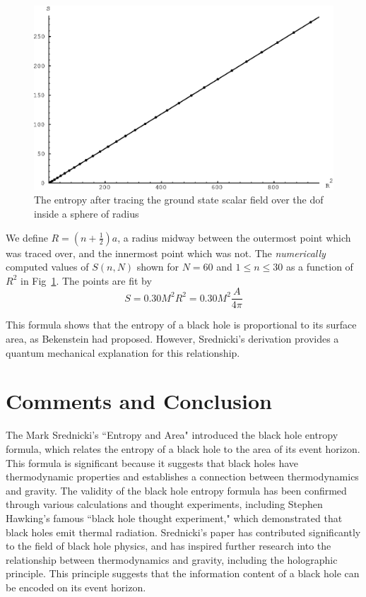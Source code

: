 \documentclass[%
 mph,%
 reprint,%
]{revtex4-2}
\begin{document}
\begin{figure}[!ht]
    \centering
    \includegraphics[scale=0.5]{msfig.eps}
    \caption{The entropy after tracing the ground state scalar field over the dof inside a sphere of radius}
    \label{fig:my_label}
\end{figure}
We define $R=(n+ \frac{1}{2})a$, a radius midway between the outermost point which was traced over, and the innermost point which was not.  The \textit{numerically} computed values of $S(n,N)$  shown for $N=60$ and $1\le n\le 30$ as a function
of $R^2$ in Fig~\ref{fig:my_label}.  The points are fit by 
\begin{equation}
    S=0.30 M^2 R^2  = 0.30 M^2 \frac{A}{4\pi}
\end{equation}


This formula shows that the entropy of a black hole is proportional to its surface area, as Bekenstein\cite{PhysRevD.7.2333} had proposed. However, Srednicki's derivation provides a quantum mechanical explanation for this relationship.


\section{Comments and Conclusion}
The Mark Srednicki's ``Entropy and Area" introduced the black hole entropy formula, which relates the entropy of a black hole to the area of its event horizon. This formula is significant because it suggests that black holes have thermodynamic properties and establishes a connection between thermodynamics and gravity. The validity of the black hole entropy formula has been confirmed through various calculations and thought experiments, including Stephen Hawking's famous ``black hole thought experiment,"\cite{Hawking:1975vcx} which demonstrated that black holes emit thermal radiation. Srednicki's paper has contributed significantly to the field of black hole physics, and has inspired further research into the relationship between thermodynamics and gravity, including the holographic principle. This principle suggests that the information content of a black hole can be encoded on its event horizon.


\end{document}
